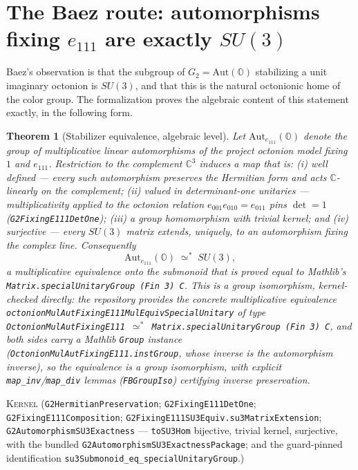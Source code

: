 \documentclass[11pt]{article}
\newcommand{\C}{\mathbb{C}}
\newcommand{\OO}{\mathbb{O}}
\newcommand{\Kernel}{\textcolor{kernelcolor}{\textsc{Kernel}}}
\newcommand{\leanname}[1]{\texttt{#1}}
\newtheorem{theorem}{Theorem}
\begin{document}
\section{The Baez route: automorphisms fixing $e_{111}$ are exactly $SU(3)$}
\label{sec:baez}

Baez's observation \cite{Baez2021} is that the subgroup of $G_2 =
\mathrm{Aut}(\OO)$ stabilizing a unit imaginary octonion is $SU(3)$, and
that this is the natural octonionic home of the color group.  The
formalization proves the algebraic content of this statement exactly,
in the following form.

\begin{theorem}[Stabilizer equivalence, algebraic level]
\label{thm:su3}
Let $\mathrm{Aut}_{e_{111}}(\OO)$ denote the group of multiplicative
linear automorphisms of the project octonion model fixing $1$ and
$e_{111}$.  Restriction to the complement $\C^3$ induces a map that is:
(i) well defined --- every such automorphism preserves the Hermitian form
and acts $\C$-linearly on the complement; (ii) valued in determinant-one
unitaries --- multiplicativity applied to the octonion relation
$e_{001}e_{010} = e_{011}$ pins
$\det = 1$ (\leanname{G2FixingE111DetOne}); (iii) a group homomorphism with trivial kernel; and (iv)
surjective --- every $SU(3)$ matrix extends, uniquely, to an automorphism
fixing the complex line.  Consequently
\[
\mathrm{Aut}_{e_{111}}(\OO) \;\simeq^*\; SU(3),
\]
a multiplicative equivalence onto the submonoid that is proved
\emph{equal} to Mathlib's
\leanname{Matrix.specialUnitaryGroup (Fin 3) C}.  This is a group
isomorphism, kernel-checked directly: the repository provides the
concrete multiplicative equivalence
\leanname{octonionMulAutFixingE111MulEquivSpecialUnitary} of type
\leanname{OctonionMulAutFixingE111 $\simeq^*$ Matrix.specialUnitaryGroup (Fin 3) C},
and both sides carry a Mathlib \leanname{Group} instance
(\leanname{OctonionMulAutFixingE111.instGroup}, whose inverse is the
automorphism inverse), so the equivalence is a group isomorphism, with
explicit \leanname{map\_inv}/\leanname{map\_div} lemmas
(\leanname{FBGroupIso}) certifying inverse preservation.
\end{theorem}
\noindent\Kernel{}\quad
(\leanname{G2HermitianPreservation};
\leanname{G2FixingE111DetOne};
\leanname{G2FixingE111Composition};
\leanname{G2FixingE111SU3Equiv.su3MatrixExtension};
\leanname{G2AutomorphismSU3Exactness} ---
\leanname{toSU3Hom} bijective, trivial kernel, surjective, with the
bundled \leanname{G2AutomorphismSU3ExactnessPackage}; and the
guard-pinned identification
\leanname{su3Submonoid\_eq\_specialUnitaryGroup}.)
\end{document}
